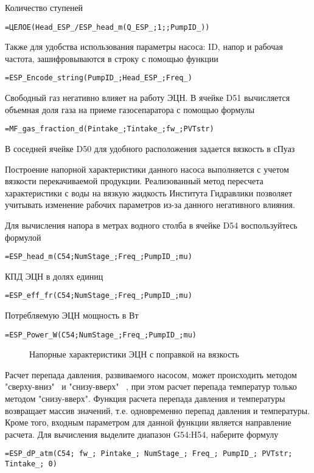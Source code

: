 Количество ступеней

{ \small  \texttt{=ЦЕЛОЕ(Head\_ESP\_/ESP\_head\_m(Q\_ESP\_;1;;PumpID\_))
}}

Также для удобства использования параметры насоса: ID, напор и рабочая частота, зашифровываются в строку с помощью функции

{ \small  \texttt{=ESP\_Encode\_string(PumpID\_;Head\_ESP\_;Freq\_)}}

Свободный газ негативно влияет на работу ЭЦН. В ячейке D51 вычисляется объемная доля газа на приеме газосепаратора с помощью формулы

{ \small  \texttt{=MF\_gas\_fraction\_d(Pintake\_;Tintake\_;fw\_;PVTstr)}}
 
В соседней ячейке D50 для удобного расположения задается вязкость в сПуаз

Построение напорной характеристики данного насоса выполняется с учетом вязкости перекачиваемой продукции. Реализованный метод пересчета характеристики с воды на вязкую жидкость Института Гидравлики позволяет учитывать изменение рабочих параметров из-за данного негативного влияния.

Для вычисления напора в метрах водного столба в ячейке D54 воспользуйтесь формулой

{ \small  \texttt{=ESP\_head\_m(C54;NumStage\_;Freq\_;PumpID\_;mu)}}

КПД ЭЦН в долях единиц 

{ \small  \texttt{=ESP\_eff\_fr(C54;NumStage\_;Freq\_;PumpID\_;mu)}}

Потребляемую ЭЦН мощность в Вт

{ \small  \texttt{=ESP\_Power\_W(C54;NumStage\_;Freq\_;PumpID\_;mu)}}

\begin{figure}[h!]
	\center{\texttt{[image: Ex70\_3]}}
	\caption{Напорные характеристики ЭЦН с поправкой на вязкость}
	\label{ris:Ex70_3}
\end{figure}

Расчет перепада давления, развиваемого насосом, может происходить методом "сверху-вниз" \  и "снизу-вверх" \ , при этом расчет перепада температур только методом "снизу-вверх". Функция расчета перепада давления и температуры возвращает массив значений, т.е. одновременно перепад давления и температуры. Кроме того, входным параметром для данной функции является направление расчета. Для вычисления выделите диапазон G54:H54, наберите формулу

{ \small  \texttt{=ESP\_dP\_atm(C54; fw\_; Pintake\_; NumStage\_; Freq\_; PumpID\_; PVTstr; Tintake\_; 0)}}

